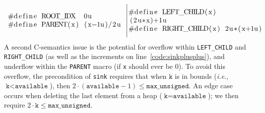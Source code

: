 \[
\begin{array}{@{}l@{~~}|@{~}l@{}}
\begin{minipage}{0.475\textwidth}
\begin{lstlisting}
#define ROOT_IDX  0u
#define PARENT(x) (x-1u)/2u
\end{lstlisting} \end{minipage} &
\begin{minipage}{0.5\textwidth}
\begin{lstlisting}[firstnumber=3]
#define LEFT_CHILD(x)  (2u*x)+1u
#define RIGHT_CHILD(x) 2u*(x+1u)
\end{lstlisting}
\end{minipage}
\end{array}
\]
A second C-semantics issue is the potential for overflow within \texttt{LEFT\_CHILD} and \texttt{RIGHT\_CHILD} (as well as the increments on line~\ref{code:sinkplusplus}), and underflow within the \texttt{PARENT} macro (if \texttt{x} should ever be 0).  To avoid this overflow, the precondition of \texttt{sink} requires that when $\texttt{k}$ is in bounds (\emph{i.e.}, $\texttt{k} < \texttt{available}$), then $2\cdot(\texttt{available}-1) \leq \texttt{max\_unsigned}$.  An edge case occurs when deleting the last element from a heap ($\texttt{k}=\texttt{available}$); we then require $2\cdot\texttt{k}\leq \texttt{max\_unsigned}$.

\lstset{style=CoqStyle}

